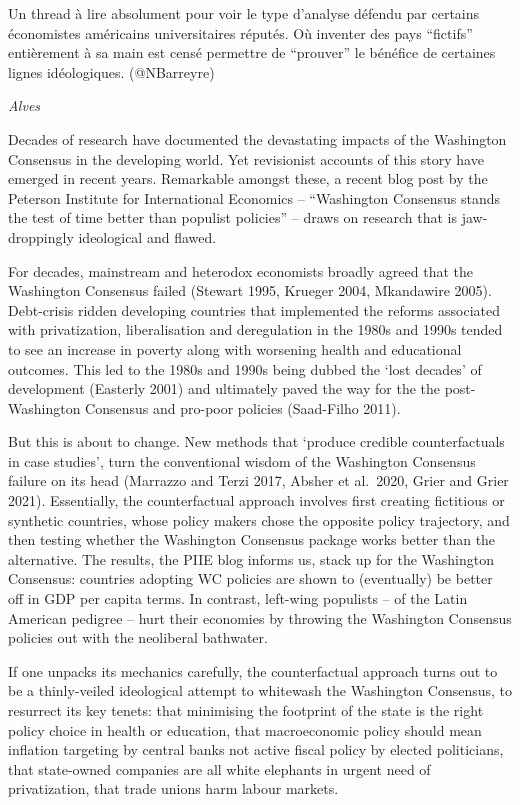 \documentclass[
]{book}
\begin{document}
Un thread à lire absolument pour voir le type d'analyse défendu par certains économistes américains universitaires réputés. Où inventer des pays ``fictifs'' entièrement à sa main est censé permettre de ``prouver'' le bénéfice de certaines lignes idéologiques.
(@NBarreyre)

\emph{Alves}

Decades of research have documented the devastating impacts of the Washington Consensus in the developing world. Yet revisionist accounts of this story have emerged in recent years. Remarkable amongst these, a recent blog post by the Peterson Institute for International Economics -- ``Washington Consensus stands the test of time better than populist policies'' -- draws on research that is jaw-droppingly ideological and flawed.

For decades, mainstream and heterodox economists broadly agreed that the Washington Consensus failed (Stewart 1995, Krueger 2004, Mkandawire 2005). Debt-crisis ridden developing countries that implemented the reforms associated with privatization, liberalisation and deregulation in the 1980s and 1990s tended to see an increase in poverty along with worsening health and educational outcomes. This led to the 1980s and 1990s being dubbed the `lost decades' of development (Easterly 2001) and ultimately paved the way for the the post-Washington Consensus and pro-poor policies (Saad-Filho 2011).

But this is about to change. New methods that `produce credible counterfactuals in case studies', turn the conventional wisdom of the Washington Consensus failure on its head (Marrazzo and Terzi 2017, Absher et al.~2020, Grier and Grier 2021). Essentially, the counterfactual approach involves first creating fictitious or synthetic countries, whose policy makers chose the opposite policy trajectory, and then testing whether the Washington Consensus package works better than the alternative. The results, the PIIE blog informs us, stack up for the Washington Consensus: countries adopting WC policies are shown to (eventually) be better off in GDP per capita terms. In contrast, left-wing populists -- of the Latin American pedigree -- hurt their economies by throwing the Washington Consensus policies out with the neoliberal bathwater.

If one unpacks its mechanics carefully, the counterfactual approach turns out to be a thinly-veiled ideological attempt to whitewash the Washington Consensus, to resurrect its key tenets: that minimising the footprint of the state is the right policy choice in health or education, that macroeconomic policy should mean inflation targeting by central banks not active fiscal policy by elected politicians, that state-owned companies are all white elephants in urgent need of privatization, that trade unions harm labour markets.
\end{document}
